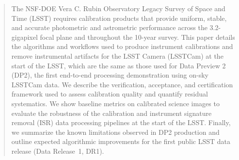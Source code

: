 
\begin{abstract}
The NSF-DOE Vera C. Rubin Observatory Legacy Survey of Space and Time (LSST) requires calibration products that provide uniform, stable, and accurate photometric and astrometric performance across the 3.2-gigapixel focal plane and throughout the 10-year survey.
This paper details the algorithms and workflows used to produce instrument calibrations and remove instrumental artifacts for the LSST Camera (LSSTCam) at the start of the LSST, which are the same as those used for Data Preview 2 (DP2), the first end-to-end processing demonstration using on-sky LSSTCam data.
We describe the verification, acceptance, and certification framework used to assess calibration quality and quantify residual systematics.
We show baseline metrics on calibrated science images to evaluate the robustness of the calibration and instrument signature removal (ISR) data processing pipelines at the start of the LSST.
Finally, we summarize the known limitations observed in DP2 production and outline expected algorithmic improvements for the first public LSST data release (Data Release~1, DR1).

\end{abstract}
